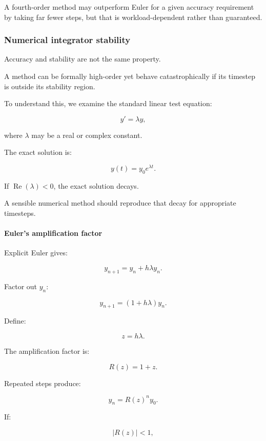 A fourth-order method may outperform Euler for a given accuracy requirement by taking far fewer steps, but that is workload-dependent rather than guaranteed.

\subsubsection{Numerical integrator stability}\label{02-foundations-ii-ch025-numerical-integrator-stability}

\hypertarget{02-foundations-ii-ch025-numerical-integrator-stability}{}

Accuracy and stability are not the same property.

A method can be formally high-order yet behave catastrophically if its timestep is outside its stability region.

To understand this, we examine the standard linear test equation:

\[
\boxed{y'=\lambda y},
\]

where \(\lambda\) may be a real or complex constant.

The exact solution is:

\[
y(t)=y_0e^{\lambda t}.
\]

If \(\operatorname{Re}(\lambda)<0\), the exact solution decays.

A sensible numerical method should reproduce that decay for appropriate timesteps.

\paragraph{Euler's amplification factor}\label{02-foundations-ii-ch025-eulers-amplification-factor}

\hypertarget{02-foundations-ii-ch025-eulers-amplification-factor}{}

Explicit Euler gives:

\[
y_{n+1}=y_n+h\lambda y_n.
\]

Factor out \(y_n\):

\[
\boxed{ y_{n+1}=(1+h\lambda)y_n }.
\]

Define:

\[
z=h\lambda.
\]

The amplification factor is:

\[
R(z)=1+z.
\]

Repeated steps produce:

\[
y_n=R(z)^ny_0.
\]

If:

\[
|R(z)|<1,
\]

